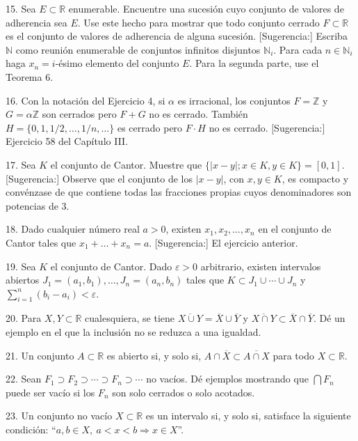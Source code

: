 \documentclass[12pt,oneside]{book}
\begin{document}
15. Sea \(E \subset \mathbb{R}\) enumerable. Encuentre una sucesión cuyo conjunto de valores de adherencia sea \(E\). Use este hecho para mostrar que todo conjunto cerrado \(F \subset \mathbb{R}\) es el conjunto de valores de adherencia de alguna sucesión. [Sugerencia:] Escriba \(\mathbb{N}\) como reunión enumerable de conjuntos infinitos disjuntos \(\mathbb{N}_i\). Para cada \(n \in \mathbb{N}_i\) haga \(x_n = i\)-ésimo elemento del conjunto \(E\). Para la segunda parte, use el Teorema 6.

16. Con la notación del Ejercicio 4, si \(\alpha\) es irracional, los conjuntos \(F = \mathbb{Z}\) y \(G = \alpha\mathbb{Z}\) son cerrados pero \(F + G\) no es cerrado. También \(H = \{0, 1, 1/2, \dots, 1/n, \dots\}\) es cerrado pero \(F \cdot H\) no es cerrado. [Sugerencia:] Ejercicio 58 del Capítulo III.

17. Sea \(K\) el conjunto de Cantor. Muestre que \(\{|x - y|; x \in K, y \in K\} = [0, 1]\). [Sugerencia:] Observe que el conjunto de los \(|x - y|\), con \(x, y \in K\), es compacto y convénzase de que contiene todas las fracciones propias cuyos denominadores son potencias de 3.

18. Dado cualquier número real \(a > 0\), existen \(x_1, x_2, \dots, x_n\) en el conjunto de Cantor tales que \(x_1 + \dots + x_n = a\). [Sugerencia:] El ejercicio anterior.

19. Sea \(K\) el conjunto de Cantor. Dado \(\varepsilon > 0\) arbitrario, existen intervalos abiertos \( J_1 = (a_1, b_1), \ldots, J_n = (a_n, b_n) \) tales que \( K \subset J_1 \cup \cdots \cup J_n \) y \( \sum_{i=1}^n (b_i - a_i) < \varepsilon \).

20. Para \( X, Y \subset \mathbb{R} \) cualesquiera, se tiene \( \overline{X \cup Y} = \overline{X} \cup \overline{Y} \) y \( \overline{X \cap Y} \subset \overline{X} \cap \overline{Y} \). Dé un ejemplo en el que la inclusión no se reduzca a una igualdad.

21. Un conjunto \( A \subset \mathbb{R} \) es abierto si, y solo si, \( A \cap \overline{X} \subset \overline{A \cap X} \) para todo \( X \subset \mathbb{R} \).

22. Sean \( F_1 \supset F_2 \supset \cdots \supset F_n \supset \cdots \) no vacíos. Dé ejemplos mostrando que \( \bigcap F_n \) puede ser vacío si los \( F_n \) son solo cerrados o solo acotados.

23. Un conjunto no vacío \( X \subset \mathbb{R} \) es un intervalo si, y solo si, satisface la siguiente condición: “\( a, b \in X, \ a < x < b \Rightarrow x \in X \)”.
\end{document}
